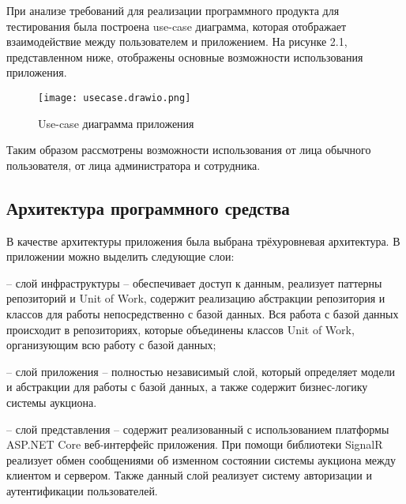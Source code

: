 При анализе требований для реализации программного продукта для тестирования была построена use-case диаграмма, 
которая отображает взаимодействие между пользователем и приложением. 
На рисунке 2.1, представленном ниже, отображены основные возможности использования приложения.

\newpage
\begin{figure}[h]
\centering
\texttt{[image: usecase.drawio.png]}
\caption{Use-case диаграмма приложения}
\end{figure}

Таким образом рассмотрены возможности использования от лица обычного пользователя, от лица администратора и сотрудника.

\subsection{Архитектура программного средства}

В качестве архитектуры приложения была выбрана трёхуровневая архитектура.
В приложении можно выделить следующие слои:

– слой инфраструктуры – обеспечивает доступ к данным, 
реализует паттерны репозиторий и Unit of Work, 
содержит реализацию абстракции репозитория и классов для работы непосредственно с базой данных. 
Вся работа с базой данных происходит в репозиториях, 
которые объединены классов Unit of Work, организующим всю работу с базой данных;  

– слой приложения – полностью независимый слой, который определяет модели и абстракции для работы с базой данных, а также содержит 
бизнес-логику системы аукциона.

– слой представления – содержит реализованный с использованием платформы
ASP.NET Core веб-интерфейс приложения. При помощи библиотеки SignalR реализует
обмен сообщениями об изменном состоянии системы аукциона между клиентом и сервером.
Также данный слой реализует систему авторизации и аутентификации пользователей.





